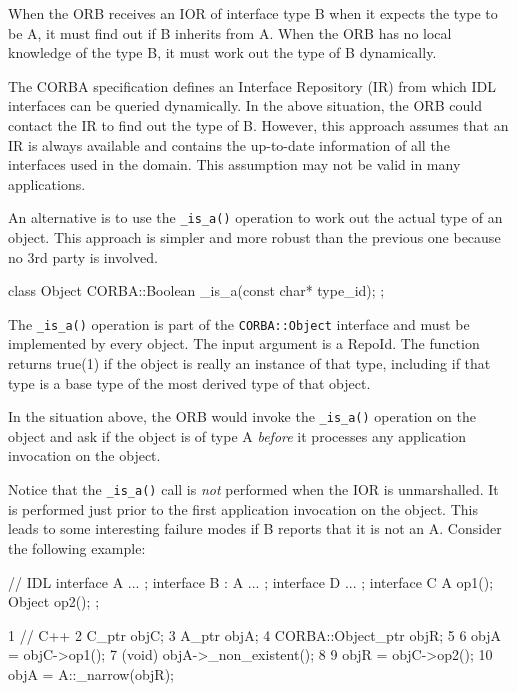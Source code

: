 \documentclass[11pt,twoside,a4paper]{book}
\newcommand{\intf}[1]{\texttt{#1}}
\newcommand{\op}[1]{\texttt{#1()}}
\begin{document}
When the ORB receives an IOR of interface type B when it expects the
type to be A, it must find out if B inherits from A. When the ORB has
no local knowledge of the type B, it must work out the type of B
dynamically.

The CORBA specification defines an Interface Repository (IR) from
which IDL interfaces can be queried dynamically. In the above
situation, the ORB could contact the IR to find out the type of B.
However, this approach assumes that an IR is always available and
contains the up-to-date information of all the interfaces used in the
domain. This assumption may not be valid in many applications.

An alternative is to use the \op{\_is\_a} operation to work out the
actual type of an object. This approach is simpler and more robust
than the previous one because no 3rd party is involved.

\begin{cxxlisting}
class Object{
    CORBA::Boolean _is_a(const char* type_id);
};
\end{cxxlisting}

The \op{\_is\_a} operation is part of the \intf{CORBA::Object}
interface and must be implemented by every object. The input argument
is a RepoId. The function returns true(1) if the object is really an
instance of that type, including if that type is a base type of the
most derived type of that object.

In the situation above, the ORB would invoke the \op{\_is\_a}
operation on the object and ask if the object is of type A
\emph{before} it processes any application invocation on the object.

Notice that the \op{\_is\_a} call is \emph{not} performed when the IOR
is unmarshalled. It is performed just prior to the first application
invocation on the object. This leads to some interesting failure modes
if B reports that it is not an A. Consider the following example:

\begin{idllisting}
// IDL
interface A { ... };
interface B : A { ... };
interface D { ... };
interface C {
  A      op1();
  Object op2();
};
\end{idllisting}

\lstset{labelstep=1,gobble=4}
\begin{cxxlisting}
 1  // C++
 2  C_ptr objC;
 3  A_ptr objA;
 4  CORBA::Object_ptr objR;
 5
 6  objA =  objC->op1();
 7  (void) objA->_non_existent();
 8
 9  objR =  objC->op2();
10  objA =  A::_narrow(objR);
\end{cxxlisting}
\lstset{labelstep=0,gobble=0}
\end{document}
